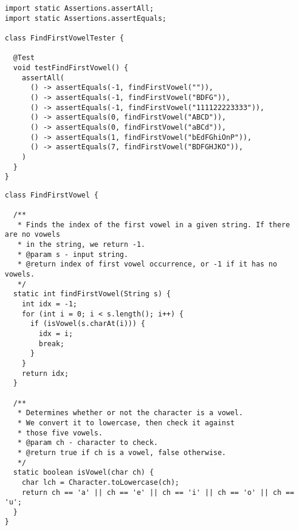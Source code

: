 \begin{lstlisting}[language=MyJava]
import static Assertions.assertAll;
import static Assertions.assertEquals;

class FindFirstVowelTester {

  @Test
  void testFindFirstVowel() {
    assertAll(
      () -> assertEquals(-1, findFirstVowel("")),
      () -> assertEquals(-1, findFirstVowel("BDFG")),
      () -> assertEquals(-1, findFirstVowel("111122223333")),
      () -> assertEquals(0, findFirstVowel("ABCD")),
      () -> assertEquals(0, findFirstVowel("aBCd")),
      () -> assertEquals(1, findFirstVowel("bEdFGhiOnP")),
      () -> assertEquals(7, findFirstVowel("BDFGHJKO")),
    )
  }
}
\end{lstlisting}

\begin{lstlisting}[language=MyJava]
class FindFirstVowel {

  /**
   * Finds the index of the first vowel in a given string. If there are no vowels
   * in the string, we return -1.
   * @param s - input string.
   * @return index of first vowel occurrence, or -1 if it has no vowels.
   */
  static int findFirstVowel(String s) {
    int idx = -1;
    for (int i = 0; i < s.length(); i++) {
      if (isVowel(s.charAt(i))) {
        idx = i;
        break;
      }
    }
    return idx;
  }

  /**
   * Determines whether or not the character is a vowel. 
   * We convert it to lowercase, then check it against 
   * those five vowels.
   * @param ch - character to check.
   * @return true if ch is a vowel, false otherwise.
   */
  static boolean isVowel(char ch) {
    char lch = Character.toLowercase(ch);
    return ch == 'a' || ch == 'e' || ch == 'i' || ch == 'o' || ch == 'u';
  }
}
\end{lstlisting}


